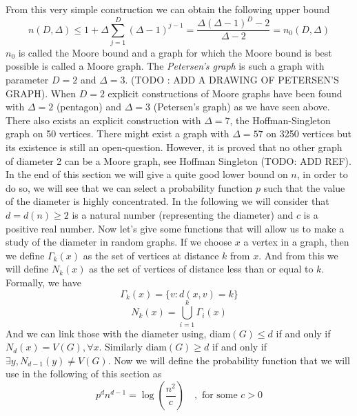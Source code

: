 From this very simple construction we can obtain the following upper bound
\begin{equation}
	n(D, \Delta) \leq 1 + \Delta \sum_{j=1}^{D}(\Delta - 1)^{j-1} = \frac{\Delta(\Delta - 1)^D - 2}{\Delta - 2} = n_0(D, \Delta)
\end{equation}
$n_0$ is called the Moore bound and a graph for which the Moore bound is best possible is called a Moore graph. 
The \emph{Petersen's graph} is such a graph with parameter $D= 2$ and $\Delta = 3$. (TODO : ADD A DRAWING OF PETERSEN'S GRAPH).
\newline
When $D=2$ explicit constructions of Moore graphs have been found with $\Delta = 2$ (pentagon) and $\Delta = 3$ (Petersen's graph) as we have seen above.
There also exists an explicit construction with $\Delta = 7$, the Hoffman-Singleton graph on 50 vertices.
There might exist a graph with $\Delta = 57$ on 3250 vertices but its existence is still an open-question.
However, it is proved that no other graph of diameter 2 can be a Moore graph, see Hoffman Singleton (TODO: ADD REF).
\newline
In the end of this section we will give a quite good lower bound on $n$, in order to do so, we will see that we can select a probability function $p$ such that the value of the diameter is highly concentrated.
\newline
In the following we will consider that $d = d(n) \geq 2$ is a natural number (representing the diameter) and $c$ is a positive real number.
\newline
Now let's give some functions that will allow us to make a study of the diameter in random graphs. If we choose $x$ a vertex in a graph, then we define $\Gamma_k(x)$ as the set of vertices at distance $k$ from $x$. And from this we will define $N_k(x)$ as the set of vertices of distance less than or equal to $k$. 
Formally, we have
\begin{equation}
	\Gamma_k(x) = \{v : d(x, v) = k \}
\end{equation}
\begin{equation}
	N_k(x) = \bigcup_{i=1}^k \Gamma_i(x)
\end{equation}
And we can link those with the diameter using, diam$(G) \leq d $ if and only if $N_d(x) = V(G), \forall x$.
\newline
Similarly diam$(G) \geq d $ if and only if $\exists y, N_{d-1}(y) \neq V(G)$.
\newline
Now we will define the probability function that we will use in the following of this section as 
\begin{equation} \label{eq:pdiam}
	p^d n^{d-1} = \log(\frac{n^2}{c}) \quad, \text{  for some } c >0
\end{equation}
